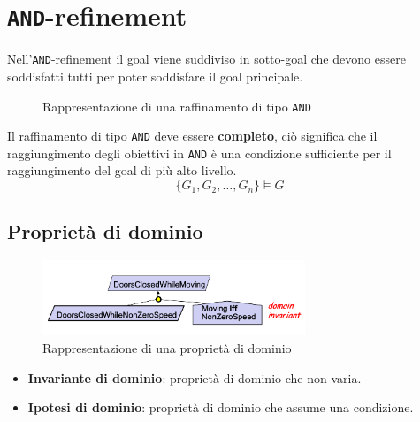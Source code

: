 \section{\texttt{AND}-refinement}
Nell'\texttt{AND}-refinement il goal viene suddiviso in sotto-goal 
che devono essere soddisfatti tutti per poter soddisfare il goal 
principale.
    \begin{figure}[H]
        \centering
        \caption{Rappresentazione di una raffinamento di tipo \texttt{AND}}
    \end{figure}
    Il raffinamento di tipo \texttt{AND} deve essere \textbf{completo}, ciò significa 
    che il raggiungimento degli obiettivi in \texttt{AND} è una condizione sufficiente 
    per il raggiungimento del goal di più alto livello.
    \[
    \{ G_1, G_2, \ldots, G_n \} \models G
    \]

\subsection{Proprietà di dominio}
    \begin{figure}[H]
        \centering
        \includegraphics[width=0.7\textwidth]{img/domain.png}
        \caption{Rappresentazione di una proprietà di dominio}
    \end{figure}
    \begin{itemize}
        \item \textbf{Invariante di dominio}: proprietà di dominio che non varia.
        \item \textbf{Ipotesi di dominio}: proprietà di dominio che assume una condizione.
    \end{itemize}
